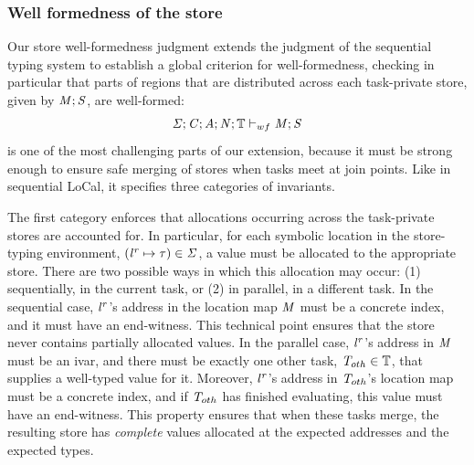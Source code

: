 \documentclass[acmsmall,acmthm=false,nonacm]{acmart}
\theoremstyle{straighttext0}
\theoremstyle{straighttext}
\begin{document}
{%

\subsubsection{Well formedness of the store}
  Our store well-formedness judgment extends the judgment of the
  sequential \seqcalc{} typing system to establish a global criterion
  for well-formedness, checking in particular that parts of regions
  that are distributed across each task-private store, given by
  $\mathit{M}; \mathit{S}$, are well-formed:
%
\begin{displaymath}
\mathit{\Sigma};\mathit{C};\mathit{A};\mathit{N};\mathbb{T} \vdash_{wf} \mathit{M};\mathit{S}
\end{displaymath}
%
\iftoggle{EXTND}{
  This judgment, defined formally in Appendix~\ref{sec:well-formedness},
}{
  This judgment, defined formally in the Appendix of
  the extended version~\cite{ParallelLoCal-tr},
}
is one of the most challenging parts of our extension, because it must be
strong enough to ensure safe merging of stores when tasks meet at join points.
%
Like in sequential LoCal, it specifies three categories of invariants.


The first category enforces that allocations occurring across the
task-private stores are accounted for.
%
In particular, for each symbolic location in the store-typing environment,
$({\mathit{l}}^{\mathit{r}} \mapsto \mathit{\tau}) \in \mathit{\Sigma}$,
a value must be allocated to the appropriate store.
%
There are two possible ways in which this allocation may occur:
(1) sequentially, in the current task, or (2) in parallel, in a different task.
%
In the sequential case, ${\mathit{l}}^{\mathit{r}}$'s address in the location map $\mathit{M}$ must be a
concrete index, and it must have an end-witness.
%
This technical point ensures that the store never contains partially allocated values.
%
In the parallel case, ${\mathit{l}}^{\mathit{r}}$'s address in $\mathit{M}$ must be an ivar,
and there must be exactly one other task, $\mathit{T}_{oth} \in \mathbb{T}$,
that supplies a well-typed value for it.
%
Moreover, ${\mathit{l}}^{\mathit{r}}$'s address in $\mathit{T}_{oth}$'s location map must be a concrete index,
and if $\mathit{T}_{oth}$ has finished evaluating, this value must have an end-witness.
%
This property ensures that when these tasks merge, the resulting store has {\em complete} values
allocated at the expected addresses and the expected types.


}
\end{document}
